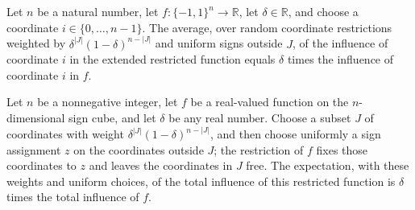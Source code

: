 \begin{theorem}
\label{FABL.expect_influence_extended_randomRestriction}
\leanok
{}
Let $n$ be a natural number, let $f:\{-1,1\}^n\to\mathbb R$, let $\delta\in\mathbb R$,
and choose a coordinate $i\in\{0,\ldots,n-1\}$. The average, over random coordinate
restrictions weighted by $\delta^{|J|}(1-\delta)^{n-|J|}$ and uniform signs outside $J$,
of the influence of coordinate $i$ in the extended restricted function equals $\delta$
times the influence of coordinate $i$ in $f$.
\end{theorem}

\begin{theorem}
\label{FABL.expect_totalInfluence_extended_randomRestriction}
\leanok
{}
Let $n$ be a nonnegative integer, let $f$ be a real-valued function on the
$n$-dimensional sign cube, and let $\delta$ be any real number. Choose a subset $J$ of
coordinates with weight $\delta^{|J|}(1-\delta)^{n-|J|}$, and then choose uniformly a
sign assignment $z$ on the coordinates outside $J$; the restriction of $f$ fixes those
coordinates to $z$ and leaves the coordinates in $J$ free. The expectation, with these
weights and uniform choices, of the total influence of this restricted function is
$\delta$ times the total influence of $f$.
\end{theorem}


